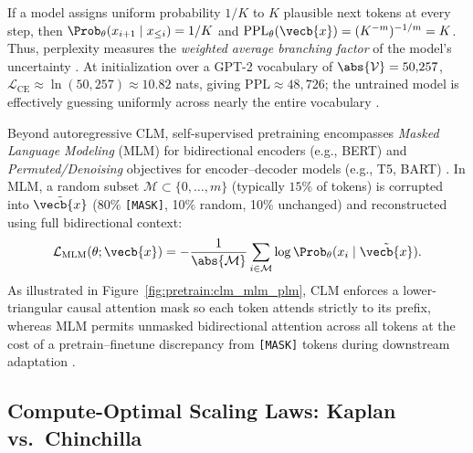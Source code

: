 \documentclass[../../../../master.tex]{subfiles}
\begin{document}
\begin{intuition}
If a model assigns uniform probability $1/K$ to $K$ plausible next tokens at every step, then $\Prob_\theta(x_{i+1}\mid x_{\le i}) = 1/K$ and $\text{PPL}_\theta(\vecb{x}) = (K^{-m})^{-1/m} = K$. Thus, perplexity measures the \emph{weighted average branching factor} of the model's uncertainty . At initialization over a GPT-2 vocabulary of $\abs{\mathcal{V}} = 50{,}257$, $\mathcal{L}_{\text{CE}} \approx \ln(50{,}257) \approx 10.82$ nats, giving $\text{PPL} \approx 48{,}726$; the untrained model is effectively guessing uniformly across nearly the entire vocabulary .
\end{intuition}

Beyond autoregressive CLM, self-supervised pretraining encompasses \emph{Masked Language Modeling} (MLM) for bidirectional encoders (e.g., BERT) and \emph{Permuted/Denoising} objectives for encoder--decoder models (e.g., T5, BART) . In MLM, a random subset $\mathcal{M} \subset \{0, \dots, m\}$ (typically $15\%$ of tokens) is corrupted into $\tilde{\vecb{x}}$ (80\% \texttt{[MASK]}, 10\% random, 10\% unchanged) and reconstructed using full bidirectional context:
\begin{equation}
  \mathcal{L}_{\text{MLM}}(\theta; \vecb{x})
  = -\frac{1}{\abs{\mathcal{M}}} \sum_{i \in \mathcal{M}} \log \Prob_\theta(x_i \mid \tilde{\vecb{x}}).
  \label{eq:pretrain:mlm}
\end{equation}
As illustrated in Figure~\ref{fig:pretrain:clm_mlm_plm}, CLM enforces a lower-triangular causal attention mask so each token attends strictly to its prefix, whereas MLM permits unmasked bidirectional attention across all tokens at the cost of a pretrain--finetune discrepancy from \texttt{[MASK]} tokens during downstream adaptation .


\subsection{Compute-Optimal Scaling Laws: Kaplan vs.\ Chinchilla}
\label{sec:pretrain:scaling}
\end{document}
